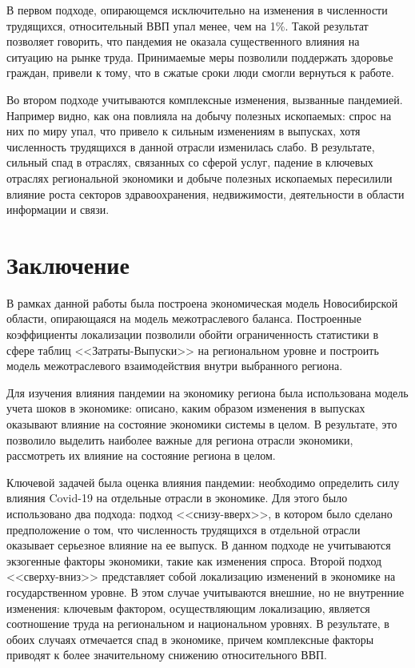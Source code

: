 \documentclass[12pt, a4paper]{article}
\begin{document}
В первом подходе, опирающемся исключительно на изменения в численности трудящихся, относительный ВВП упал менее, чем на 1\%. Такой результат позволяет говорить, что пандемия не оказала существенного влияния на ситуацию на рынке труда. Принимаемые меры позволили поддержать здоровье граждан, привели к тому, что в сжатые сроки люди смогли вернуться к работе.

Во втором подходе учитываются комплексные изменения, вызванные пандемией. Например видно, как она повлияла на добычу полезных ископаемых: спрос на них по миру упал, что привело к сильным изменениям в выпусках, хотя численность трудящихся в данной отрасли изменилась слабо. В результате, сильный спад в отраслях, связанных со сферой услуг, падение в ключевых отраслях региональной экономики и добыче полезных ископаемых пересилили влияние роста секторов здравоохранения, недвижимости, деятельности в области информации и связи.
\section{Заключение}
В рамках данной работы была построена экономическая модель Новосибирской области, опирающаяся на модель межотраслевого баланса. Построенные коэффициенты локализации позволили обойти ограниченность статистики в сфере таблиц <<Затраты-Выпуски>> на региональном уровне и построить модель межотраслевого взаимодействия внутри выбранного региона.

Для изучения влияния пандемии на экономику региона была использована модель учета шоков в экономике: описано, каким образом изменения в выпусках оказывают влияние на состояние экономики системы в целом. В результате, это позволило выделить наиболее важные для региона отрасли экономики, рассмотреть их влияние на состояние региона в целом.

Ключевой задачей была оценка влияния пандемии: необходимо определить силу влияния Covid-19 на отдельные отрасли в экономике. Для этого было использовано два подхода: подход <<снизу-вверх>>, в котором было сделано предположение о том, что численность трудящихся в отдельной отрасли оказывает серьезное влияние на ее выпуск. В данном подходе не учитываются экзогенные факторы экономики, такие как изменения спроса.
Второй подход <<сверху-вниз>> представляет собой локализацию изменений в экономике на государственном уровне. В этом случае учитываются внешние, но не внутренние изменения: ключевым фактором, осуществляющим локализацию, является соотношение труда на региональном и национальном уровнях.
В результате, в обоих случаях отмечается спад в экономике, причем комплексные факторы приводят к более значительному снижению относительного ВВП. 
\newpage


\end{document}
